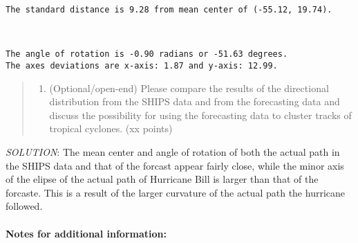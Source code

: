 \documentclass[11pt]{article}
\providecommand{\tightlist}{%
      \setlength{\itemsep}{0pt}\setlength{\parskip}{0pt}}
\begin{document}
    \begin{Verbatim}[commandchars=\\\{\}]
The standard distance is 9.28 from mean center of (-55.12, 19.74).

    \end{Verbatim}

    \begin{center}
    \end{center}
    { \hspace*{\fill} \\}
    
    \begin{Verbatim}[commandchars=\\\{\}]
The angle of rotation is -0.90 radians or -51.63 degrees.
The axes deviations are x-axis: 1.87 and y-axis: 12.99.

    \end{Verbatim}


    \begin{quote}
\begin{enumerate}
\def\labelenumi{\alph{enumi}.}
\setcounter{enumi}{4}
\tightlist
\item
  (Optional/open-end) Please compare the results of the directional
  distribution from the SHIPS data and from the forecasting data and
  discuss the possibility for using the forecasting data to cluster
  tracks of tropical cyclones. (xx points)
\end{enumerate}
\end{quote}

\vskip 0.2in


    \emph{SOLUTION}: The mean center and angle of rotation of both the
actual path in the SHIPS data and that of the forcast appear fairly
close, while the minor axis of the elipse of the actual path of
Hurricane Bill is larger than that of the forcaste. This is a result of
the larger curvature of the actual path the hurricane followed.

\vskip 0.2in


    \hypertarget{notes-for-additional-information}{%
\paragraph{Notes for additional
information:}\label{notes-for-additional-information}}
\end{document}
